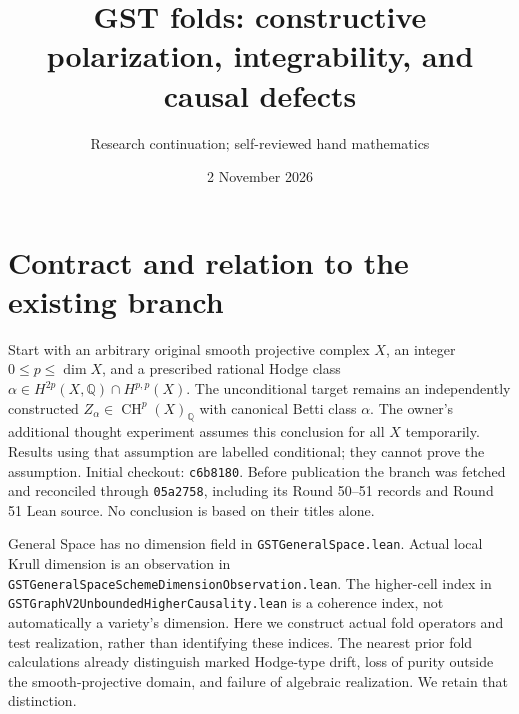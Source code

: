 \documentclass[11pt]{article}
\title{GST folds: constructive polarization, integrability, and causal defects}
\author{Research continuation; self-reviewed hand mathematics}
\date{2 November 2026}
\newcommand{\Q}{\mathbb Q}
\newcommand{\CH}{\operatorname{CH}}
\begin{document}
\maketitle

\section{Contract and relation to the existing branch}
Start with an arbitrary original smooth projective complex $X$, an integer
$0\leq p\leq\dim X$, and a prescribed rational Hodge class
$\alpha\in H^{2p}(X,\Q)\cap H^{p,p}(X)$.
The unconditional target remains an independently constructed
$Z_\alpha\in\CH^p(X)_\Q$ with canonical Betti class $\alpha$.
The owner's additional thought experiment assumes this conclusion for all
$X$ temporarily. Results using that assumption are labelled conditional;
they cannot prove the assumption.
Initial checkout: \texttt{c6b8180}. Before publication the branch was fetched
and reconciled through \texttt{05a2758}, including its Round 50--51 records
and Round 51 Lean source. No conclusion is based on their titles alone.

General Space has no dimension field in \texttt{GSTGeneralSpace.lean}.
Actual local Krull dimension is an observation in
\texttt{GSTGeneralSpaceSchemeDimensionObservation.lean}. The higher-cell
index in \texttt{GSTGraphV2UnboundedHigherCausality.lean} is a coherence
index, not automatically a variety's dimension. Here we construct actual
fold operators and test realization, rather than identifying these indices.
The nearest prior fold calculations already distinguish marked Hodge-type
drift, loss of purity outside the smooth-projective domain, and failure of
algebraic realization. We retain that distinction.
\end{document}
